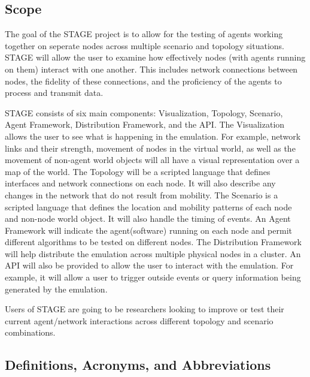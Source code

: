 \documentclass[titlepage]{article}
\begin{document}

\subsection{Scope%
  \label{scope}%
}


The goal of the STAGE project is to allow for the testing of agents working together on seperate nodes across multiple scenario and topology situations.  STAGE will allow the user to examine how effectively nodes (with agents running on them) interact with one another.  This includes network connections between nodes, the fidelity of these connections, and the proficiency of the agents to process and transmit data.

STAGE consists of six main components: Visualization, Topology, Scenario, Agent Framework, Distribution Framework, and the API.  The Visualization allows the user to see what is happening in the emulation.  For example, network links and their strength, movement of nodes in the virtual world, as well as the movement of non-agent world objects will all have a visual representation over a map of the world.  The Topology will be a scripted language that defines interfaces and network connections on each node.  It will also describe any changes in the network that do not result from mobility.  The Scenario is a scripted language that defines the location and mobility patterns of each node and non-node world object. It will also handle the timing of events. An Agent Framework will indicate the agent(software) running on each node and permit different algorithms to be tested on different nodes.  The Distribution Framework will help distribute the emulation across multiple physical nodes in a cluster.  An API will also be provided to allow the user to interact with the emulation.  For example, it will allow a user to trigger outside events or query information being generated by the emulation. 

Users of STAGE are going to be researchers looking to improve or test their current agent/network interactions across different topology and scenario combinations.  

\subsection{Definitions, Acronyms, and Abbreviations%
  \label{definitions}%
}
\end{document}
